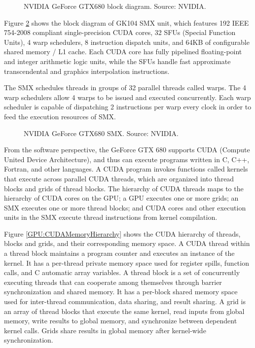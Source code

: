 \begin{figure}
\centering
\caption{NVIDIA GeForce GTX680 block diagram. Source: NVIDIA.}
\label{GPU:GeForceGTX680BlockDiagram}
\end{figure}

Figure \ref{GPU:GeForceGTX680SMX} shows the block diagram of GK104 SMX unit, which features 192 IEEE 754-2008 compliant single-precision CUDA cores, 32 SFUs (Special Function Units), 4 warp schedulers, 8 instruction dispatch units, and 64KB of configurable shared memory / L1 cache. Each CUDA core has fully pipelined floating-point and integer arithmetic logic units, while the SFUs handle fast approximate transcendental and graphics interpolation instructions.

The SMX schedules threads in groups of 32 parallel threads called warps. The 4 warp schedulers allow 4 warps to be issued and executed concurrently. Each warp scheduler is capable of dispatching 2 instructions per warp every clock in order to feed the execution resources of SMX.

\begin{figure}
\centering
\caption{NVIDIA GeForce GTX680 SMX. Source: NVIDIA.}
\label{GPU:GeForceGTX680SMX}
\end{figure}

From the software perspective, the GeForce GTX 680 supports CUDA (Compute United Device Architecture), and thus can execute programs written in C, C++, Fortran, and other languages. A CUDA program invokes functions called kernels that execute across parallel CUDA threads, which are organized into thread blocks and grids of thread blocks. The hierarchy of CUDA threads maps to the hierarchy of CUDA cores on the GPU; a GPU executes one or more grids; an SMX executes one or more thread blocks; and CUDA cores and other execution units in the SMX execute thread instructions from kernel compilation.

Figure \ref{GPU:CUDAMemoryHierarchy} shows the CUDA hierarchy of threads, blocks and grids, and their corresponding memory space. A CUDA thread within a thread block maintains a program counter and executes an instance of the kernel. It has a per-thread private memory space used for register spills, function calls, and C automatic array variables. A thread block is a set of concurrently executing threads that can cooperate among themselves through barrier synchronization and shared memory. It has a per-block shared memory space used for inter-thread communication, data sharing, and result sharing. A grid is an array of thread blocks that execute the same kernel, read inputs from global memory, write results to global memory, and synchronize between dependent kernel calls. Grids share results in global memory after kernel-wide synchronization.

